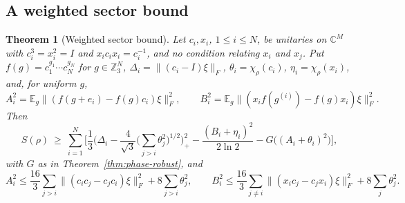 \documentclass[11pt,a4paper]{article}
\theoremstyle{plain}
\newtheorem{theorem}{Theorem}[section]
\theoremstyle{definition}
\theoremstyle{remark}
\begin{document}
\subsection{A weighted sector bound}

\begin{theorem}[Weighted sector bound]\label{thm:weighted-sector}
Let $c_i,x_i$, $1\le i\le N$, be unitaries on $\mathbb C^M$ with $c_i^3=x_i^2=I$ and $x_ic_ix_i=c_i^{-1}$, and no condition relating
$x_i$ and $x_j$. Put $f(g)=c_1^{g_1}\cdots c_N^{g_N}$ for $g\in\mathbb Z_3^N$, $\Delta_i=\|(c_i-I)\xi\|_F$, $\theta_i=\chi_\rho(c_i)$,
$\eta_i=\chi_\rho(x_i)$, and, for uniform $g$,
\[
A_i^2=\mathbb E_g\|(f(g+e_i)-f(g)c_i)\xi\|_F^2,\qquad B_i^2=\mathbb E_g\|(x_if(g^{(i)})-f(g)x_i)\xi\|_F^2 .
\]
Then
\[
S(\rho)\ \ge\ \sum_{i=1}^N\Big[\frac13\Big(\Delta_i-\frac4{\sqrt3}\Big(\sum_{j>i}\theta_j^2\Big)^{1/2}\Big)_+^2-\frac{(B_i+\eta_i)^2}{2\ln2}
-G\big((A_i+\theta_i)^2\big)\Big],
\]
with $G$ as in Theorem~\ref{thm:phase-robust}, and
\[
A_i^2\le\frac{16}3\sum_{j>i}\|(c_ic_j-c_jc_i)\xi\|_F^2+8\sum_{j>i}\theta_j^2,\qquad
B_i^2\le\frac{16}3\sum_{j\ne i}\|(x_ic_j-c_jx_i)\xi\|_F^2+8\sum_j\theta_j^2 .
\]
\end{theorem}
\end{document}
